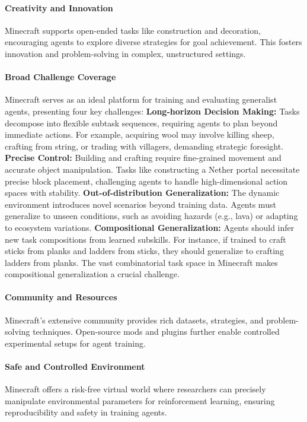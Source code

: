 \paragraph{Creativity and Innovation}
Minecraft supports open-ended tasks like construction and decoration, encouraging agents to explore diverse strategies for goal achievement. This fosters innovation and problem-solving in complex, unstructured settings.

\paragraph{Broad Challenge Coverage}
Minecraft serves as an ideal platform for training and evaluating generalist agents, presenting four key challenges: \textbf{Long-horizon Decision Making:} Tasks decompose into flexible subtask sequences, requiring agents to plan beyond immediate actions. For example, acquiring wool may involve killing sheep, crafting from string, or trading with villagers, demanding strategic foresight. \textbf{Precise Control:} Building and crafting require fine-grained movement and accurate object manipulation. Tasks like constructing a Nether portal necessitate precise block placement, challenging agents to handle high-dimensional action spaces with stability. \textbf{Out-of-distribution Generalization:} The dynamic environment introduces novel scenarios beyond training data. Agents must generalize to unseen conditions, such as avoiding hazards (e.g., lava) or adapting to ecosystem variations. \textbf{Compositional Generalization:} Agents should infer new task compositions from learned subskills. For instance, if trained to craft sticks from planks and ladders from sticks, they should generalize to crafting ladders from planks. The vast combinatorial task space in Minecraft makes compositional generalization a crucial challenge.

\paragraph{Community and Resources}
Minecraft's extensive community provides rich datasets, strategies, and problem-solving techniques. Open-source mods and plugins further enable controlled experimental setups for agent training. 

\paragraph{Safe and Controlled Environment} Minecraft offers a risk-free virtual world where researchers can precisely manipulate environmental parameters for reinforcement learning, ensuring reproducibility and safety in training agents.

